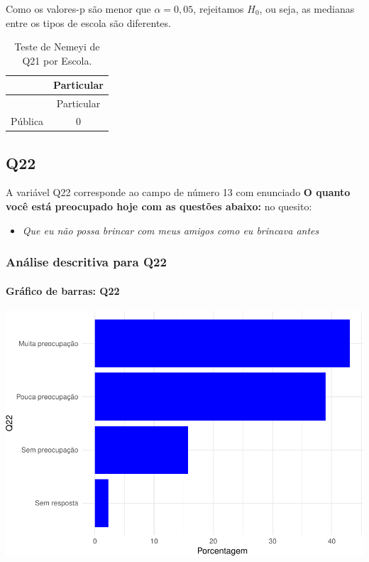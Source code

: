 \documentclass[]{article}
\providecommand{\tightlist}{%
  \setlength{\itemsep}{0pt}\setlength{\parskip}{0pt}}
\let\oldparagraph\paragraph
\renewcommand{\paragraph}[1]{\oldparagraph{#1}\mbox{}}
\begin{document}
Como os valores-p são menor que \(\alpha=0,05\), rejeitamos \(H_0\), ou seja, as medianas entre os tipos de escola são diferentes.

\begin{longtable}[]{@{}lc@{}}
\caption{\label{tab:unnamed-chunk-360}Teste de Nemeyi de Q21 por Escola.}\tabularnewline
\toprule
& Particular\tabularnewline
\midrule
\endfirsthead
\toprule
& Particular\tabularnewline
\midrule
\endhead
Pública & 0\tabularnewline
\bottomrule
\end{longtable}

\cleardoublepage

\hypertarget{q22}{%
\subsection{Q22}\label{q22}}

A variável Q22 corresponde ao campo de número 13 com enunciado \textbf{O quanto você está preocupado hoje com as questões abaixo:} no quesito:

\begin{itemize}
\tightlist
\item
  \emph{Que eu não possa brincar com meus amigos como eu brincava antes}
\end{itemize}

\hypertarget{anuxe1lise-descritiva-para-q22}{%
\subsubsection{Análise descritiva para Q22}\label{anuxe1lise-descritiva-para-q22}}

\hypertarget{gruxe1fico-de-barras-q22}{%
\paragraph{Gráfico de barras: Q22}\label{gruxe1fico-de-barras-q22}}

\begin{center}\includegraphics[width=0.75\linewidth]{relatorio_files/figure-latex/unnamed-chunk-361-1} \end{center}
\end{document}
